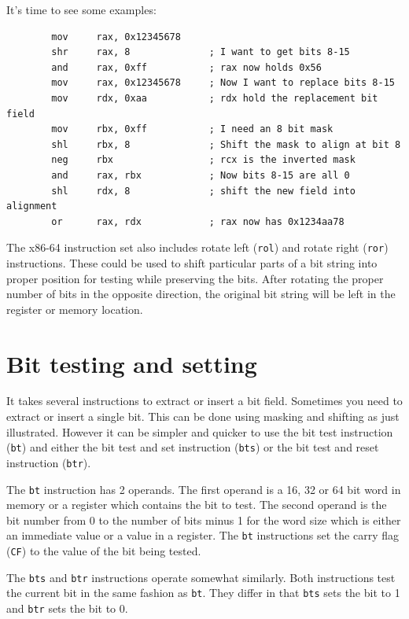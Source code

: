 \documentclass[11pt,b5paper]{book}
\begin{document}
It's time to see some examples:
\begin{verbatim}
        mov     rax, 0x12345678
        shr     rax, 8              ; I want to get bits 8-15
        and     rax, 0xff           ; rax now holds 0x56
        mov     rax, 0x12345678     ; Now I want to replace bits 8-15
        mov     rdx, 0xaa           ; rdx hold the replacement bit field
        mov     rbx, 0xff           ; I need an 8 bit mask
        shl     rbx, 8              ; Shift the mask to align at bit 8
        neg     rbx                 ; rcx is the inverted mask
        and     rax, rbx            ; Now bits 8-15 are all 0
        shl     rdx, 8              ; shift the new field into alignment
        or      rax, rdx            ; rax now has 0x1234aa78
\end{verbatim}

The x86-64 instruction set also includes rotate left ({\tt rol}) and 
rotate right ({\tt ror}) instructions.
These could be used to shift particular parts of a bit string into proper position for testing while preserving the bits.
After rotating the proper number of bits in the opposite direction, the original bit string will be left in the register or memory location.


\section{Bit testing and setting}

It takes several instructions to extract or insert a bit field. 
Sometimes you need to extract or insert a single bit.
This can be done using masking and shifting as just illustrated.
However it can be simpler and quicker to use the
bit test instruction ({\tt bt}) and
either the bit test and set instruction ({\tt bts}) or the 
bit test and reset instruction ({\tt btr}). 

The {\tt bt} instruction has 2 operands.
The first operand is a 16, 32 or 64 bit word in memory or a register which
contains the bit to test.
The second operand is the bit number from 0 to the number of bits minus 1 for
the word size which is either an immediate value or a value in a register.
The {\tt bt} instructions set the carry flag ({\tt CF}) to the value of
the bit being tested.

The {\tt bts} and {\tt btr} instructions operate somewhat similarly.
Both instructions test the current bit in the same fashion as {\tt bt}.
They differ in that {\tt bts} sets the bit to 1 and {\tt btr} sets the bit to 0.
\end{document}

